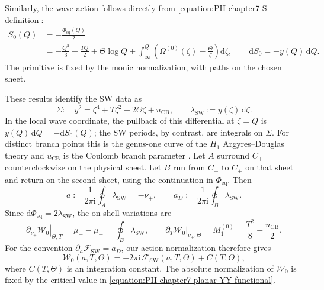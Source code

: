 \documentclass[a4paper,11pt]{article}
\newcommand{\dd}{\mathrm{d}}
\numberwithin{equation}{section}
\begin{document}
Similarly, the wave action follows directly from
\eqref{equation:PII chapter7 S definition}:
\begin{equation}
	\label{equation:PII chapter7 leading wave}
	\begin{aligned}
		S_{0}(Q)
		&=-\frac{\Phi_{\mathrm{eq}}(Q)}{2}\\
		&=-\frac{Q^{3}}{3}-\frac{TQ}{2}+\Theta\log{Q}
		+\int_{\infty}^{Q}\left(
		\Omega^{(0)}(\zeta)-\frac{\Theta}{\zeta}\right)\dd\zeta,
		\qquad \dd S_{0}=-y(Q)\,\dd Q.
	\end{aligned}
\end{equation}
The primitive is fixed by the monic normalization, with paths
on the chosen sheet.

These results identify the SW data as
\begin{equation}
	\label{equation:PII chapter7 SW data}
	\Sigma:\quad y^{2}=\zeta^{4}+T\zeta^{2}-2\Theta\zeta+u_{\mathrm{CB}},
	\qquad \lambda_{\mathrm{SW}}:=y(\zeta)\,\dd\zeta.
\end{equation}
In the local wave coordinate, the pullback of this differential
at $\zeta=Q$ is $y(Q)\,\dd Q=-\dd S_{0}(Q)$;
the SW periods, by contrast, are integrals on $\Sigma$.
For distinct branch points this is the genus-one curve of the
$H_{1}$ Argyres--Douglas theory \cite{GrassiGu2019} and $u_{\mathrm{CB}}$ is the Coulomb branch parameter .
Let $A$ surround $C_{+}$ counterclockwise on the physical sheet.
Let $B$ run from $C_{-}$ to $C_{+}$ on that sheet and return
on the second sheet, using the continuation in $\Phi_{\mathrm{eq}}$.
Then
\begin{equation}
	\label{equation:PII chapter7 a period}
	a:=\frac{1}{2\pi\mathrm{i}}\oint_{A}\lambda_{\mathrm{SW}}
	=-\nu_{+},\qquad
	a_{D}:=\frac{1}{2\pi\mathrm{i}}\oint_{B}\lambda_{\mathrm{SW}}.
\end{equation}
Since $\dd\Phi_{\mathrm{eq}}=2\lambda_{\mathrm{SW}}$, the on-shell
variations are
\begin{equation}
	\label{equation:PII chapter7 B relation}
	\left.\partial_{\nu_{+}}\mathcal{W}_{0}\right|_{\Theta,T}
	=\mu_{+}-\mu_{-}=\oint_{B}\lambda_{\mathrm{SW}},
	\qquad
	\left.\partial_{T}\mathcal{W}_{0}\right|_{\nu_{+},\Theta}
	=M_{1}^{(0)}=\frac{T^{2}}{8}-\frac{u_{\mathrm{CB}}}{2}.
\end{equation}
For the convention $\partial_{a}\mathcal{F}_{\mathrm{SW}}=a_{D}$,
our action normalization therefore gives
\begin{equation}
	\label{equation:PII chapter7 W0 SW identification}
	\mathcal{W}_{0}(a,T,\Theta)
	=-2\pi\mathrm{i}\,\mathcal{F}_{\mathrm{SW}}(a,T,\Theta)
	+C(T,\Theta),
\end{equation}
where $C(T,\Theta)$ is an integration constant.
The absolute normalization of $\mathcal{W}_{0}$ is fixed by
the critical value in \eqref{equation:PII chapter7 planar YY functional}.
\end{document}
